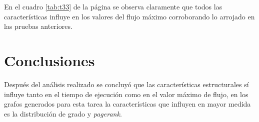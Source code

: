 \documentclass{article}
\begin{document}
En el cuadro \ref{tab:t33} de la página \pageref{tab:t33} se observa claramente que todos las características influye en los valores del flujo máximo corroborando lo arrojado en las pruebas anteriores.

\newpage
\section{Conclusiones}

Después del análisis realizado se concluyó que las características estructurales sí influye tanto en el tiempo de ejecución como en el valor máximo de flujo, en los grafos generados para esta tarea la características que influyen en mayor medida es la distribución de grado y \textit{pagerank}.

\newpage


\end{document}
